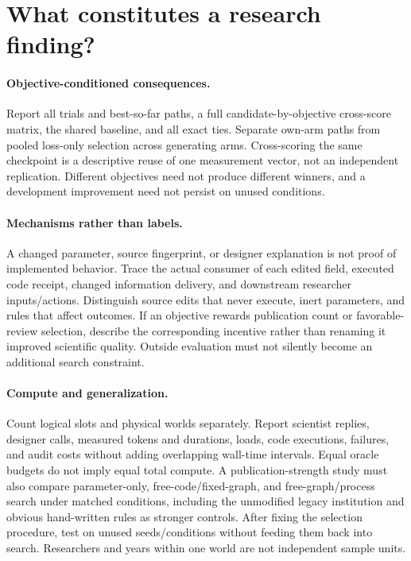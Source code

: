 \documentclass{article}
\begin{document}
\section{What constitutes a research finding?}
\label{sec:analysis}
\paragraph{Objective-conditioned consequences.}
Report all trials and best-so-far paths, a full candidate-by-objective
cross-score matrix, the shared baseline, and all exact ties. Separate own-arm
paths from pooled loss-only selection across generating arms. Cross-scoring
the same checkpoint is a descriptive reuse of one measurement vector, not an
independent replication. Different objectives need not produce different
winners, and a development improvement need not persist on unused conditions.

\paragraph{Mechanisms rather than labels.}
A changed parameter, source fingerprint, or designer explanation is not proof
of implemented behavior. Trace the actual consumer of each edited field,
executed code receipt, changed information delivery, and downstream researcher
inputs/actions. Distinguish source edits that never execute, inert parameters,
and rules that affect outcomes. If an objective rewards publication count or
favorable-review selection, describe the corresponding incentive rather than
renaming it improved scientific quality. Outside evaluation must not silently
become an additional search constraint.

\paragraph{Compute and generalization.}
Count logical slots and physical worlds separately. Report scientist replies,
designer calls, measured tokens and durations, loads, code executions, failures,
and audit costs without adding overlapping wall-time intervals. Equal oracle
budgets do not imply equal total compute. A publication-strength study must
also compare parameter-only, free-code/fixed-graph, and free-graph/process
search under matched conditions, including the unmodified legacy institution
and obvious hand-written rules as stronger controls. After fixing the selection procedure, test
on unused seeds/conditions without feeding them back into search. Researchers
and years within one world are not independent sample units.
\end{document}
